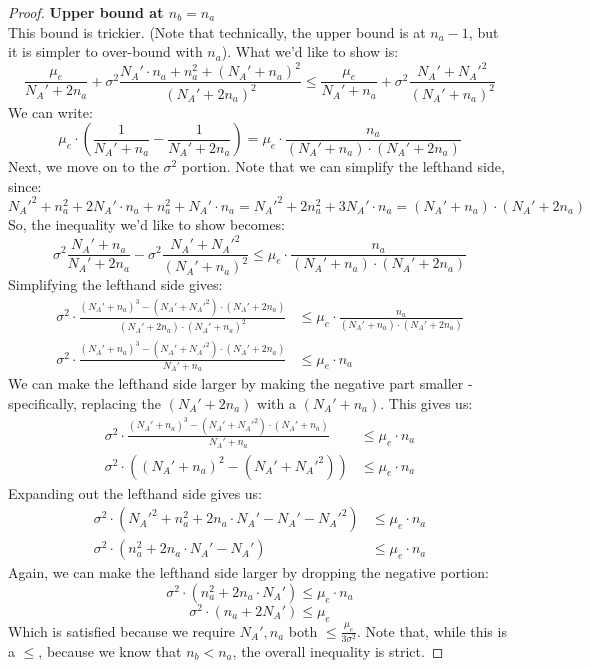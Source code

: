 \documentclass{article}
\newcommand{\p}[1]{\left( #1 \right)}
\newcommand{\cd}[0]{\cdot}
\newcommand{\mue}[0]{\ensuremath{\mu_e}}
\newcommand{\var}[0]{\ensuremath{\sigma^2}}
\newcommand{\ndraw}[0]{\ensuremath{n}}
\newcommand{\total}[0]{\ensuremath{N}}
\begin{document}
\begin{proof}
\textbf{Upper bound at $\ndraw_b=\ndraw_a$}\\
This bound is trickier. (Note that technically, the upper bound is at $\ndraw_a -1$, but it is simpler to over-bound with $\ndraw_a$). What we'd like to show is: 
$$\frac{\mue}{\total_A' + 2\ndraw_a} + \var \frac{\total_A' \cd \ndraw_a + \ndraw_a^2 + (\total_A' + \ndraw_a)^2}{(\total_A' + 2\ndraw_a)^2} \leq \frac{\mue}{\total_A' + \ndraw_a} + \var \frac{\total_A' + \total_A'^2}{(\total_A' + \ndraw_a)^2}$$
We can write: 
$$\mue \cd \p{\frac{1}{\total_A' + \ndraw_a} - \frac{1}{\total_A' + 2 \ndraw_a}} = \mue \cd \frac{\ndraw_a}{(\total_A' + \ndraw_a) \cd (\total_A' + 2 \ndraw_a)}$$
Next, we move on to the $\var$ portion. Note that we can simplify the lefthand side, since: 
$$\total_A'^2 + \ndraw_a^2 + 2 \total_A' \cd \ndraw_a + \ndraw_a^2 + \total_A' \cd \ndraw_a = \total_A'^2 + 2\ndraw_a^2 + 3 \total_A' \cd \ndraw_a  = (\total_A' + \ndraw_a) \cd (\total_A' + 2 \ndraw_a)$$
So, the inequality we'd like to show becomes: 
$$\var \frac{\total_A' + \ndraw_a}{\total_A' + 2 \ndraw_a} - \var \frac{\total_A' + \total_A'^2}{(\total_A'+ \ndraw_a)^2} \leq \mue \cd \frac{\ndraw_a}{(\total_A' + \ndraw_a) \cd (\total_A' + 2 \ndraw_a)}$$
Simplifying the lefthand side gives: 
\begin{align*}
\var \cd \frac{(\total_A' + \ndraw_a)^3 - (\total_A' + \total_A'^2) \cd (\total_A' + 2 \ndraw_a)}{(\total_A' +2\ndraw_a) \cd (\total_A' + \ndraw_a)^2} &\leq \mue \cd \frac{\ndraw_a}{(\total_A' + \ndraw_a) \cd (\total_A' + 2 \ndraw_a)}\\
\var \cd \frac{(\total_A' + \ndraw_a)^3 - (\total_A' + \total_A'^2) \cd (\total_A' + 2 \ndraw_a)}{\total_A' + \ndraw_a} &\leq \mue \cd \ndraw_a
\end{align*}
We can make the lefthand side larger by making the negative part smaller - specifically, replacing the $(\total_A' + 2\ndraw_a)$ with a  $(\total_A' + \ndraw_a)$. This gives us: 
\begin{align*}
\var \cd \frac{(\total_A' + \ndraw_a)^3 - (\total_A' + \total_A'^2) \cd (\total_A' + \ndraw_a)}{\total_A' + \ndraw_a} &\leq \mue \cd \ndraw_a \\
\var \cd \p{(\total_A' + \ndraw_a)^2 - (\total_A' + \total_A'^2)} &\leq \mue \cd \ndraw_a
\end{align*}
Expanding out the lefthand side gives us: 
\begin{align*}
\var \cd (\total_A'^2 + \ndraw_a^2 + 2 \ndraw_a \cd \total_A' - \total_A' - \total_A'^2) &\leq \mue \cd \ndraw_a\\
\var \cd ( \ndraw_a^2 + 2 \ndraw_a \cd \total_A' - \total_A') &\leq \mue \cd \ndraw_a
\end{align*}
Again, we can make the lefthand side larger by dropping the negative portion: 
$$\var \cd ( \ndraw_a^2 + 2 \ndraw_a \cd \total_A') \leq \mue \cd \ndraw_a$$
$$\var \cd ( \ndraw_a + 2 \total_A') \leq \mue$$
Which is satisfied because we require $\total_A', \ndraw_a$ both $\leq \frac{\mue}{3\var}$. 
Note that, while this is a $\leq$, because we know that $\ndraw_b < \ndraw_a$, the overall inequality is strict. 
\end{proof}
\end{document}
